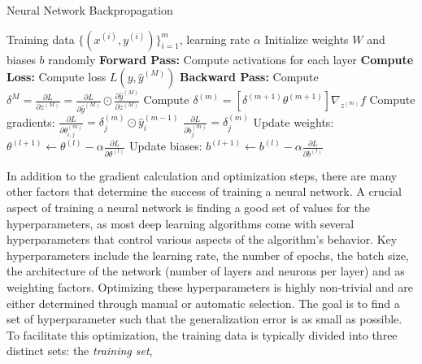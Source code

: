 \begin{algorithm}
    \caption{Neural Network Backpropagation \cite{rumelhart1986learning}}
    \label{alg:backprop}
    \begin{algorithmic}[1]
    \Require Training data $\{(x^{(i)}, y^{(i)})\}_{i=1}^{m}$, learning rate $\alpha$
    \State Initialize weights $W$ and biases $b$ randomly
    \Repeat
            \State \textbf{Forward Pass:}
            \State Compute activations for each layer
            \State \textbf{Compute Loss:}
            \State Compute loss $L(y, \hat{y}^{(M)})$
            \State \textbf{Backward Pass:}
            \State Compute $\delta^{M} = \frac{\partial L}{\partial z^{(M)}} = \frac{\partial L}{\partial \hat{y}^{(M)}} \odot \frac{\partial \hat{y}^{(M)}}{\partial z^{(M)}}$
                \State Compute $\delta^{(m)} = [\delta^{(m+1)} \theta^{(m+1)}] \nabla_{z^{(m)}} f$
                \State Compute gradients:
                \State $\frac{\partial L}{\partial \theta_{i,j}^{(m)}} = \delta^{(m)}_j \odot \hat{y}_i^{(m-1)}$
                \State $\frac{\partial L}{\partial b_j^{(m)}} = \delta_j^{(m)}$
            \EndFor
        \EndFor
            \State Update weights: $\theta^{(l+1)} \leftarrow \theta^{(l)} - \alpha \frac{\partial L}{\partial \theta^{(l)}}$
            \State Update biases: $b^{(l+1)} \leftarrow b^{(l)} - \alpha \frac{\partial L}{\partial b^{(l)}}$
        \EndFor
    \end{algorithmic}
    \end{algorithm}
In addition to the gradient calculation and optimization steps, there are many other factors that determine the success of training a neural network.
A crucial aspect of training a neural network is finding a good set of values for the hyperparameters,
as most deep learning algorithms come with several hyperparameters that control various aspects of the algorithm's behavior.
Key hyperparameters include the learning rate,
the number of epochs, the batch size, the architecture of the network (number of layers and neurons per layer) and as weighting factors.
Optimizing these hyperparameters is highly non-trivial and are either determined through manual or automatic selection.
The goal is to find a set of hyperparameter such that the generalization error is as small as possible.
To facilitate this optimization, the training data is typically divided into three distinct sets: the \emph{training set},
